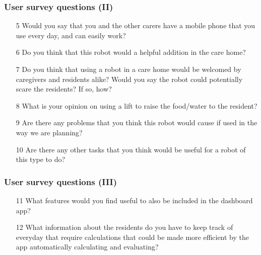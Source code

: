 \documentclass{beamer}
\begin{document}
\begin{frame}
  \frametitle{User survey questions (II)}
  \begin{enumerate}
    \item[5] Would you say that you and the other carers have a mobile phone that you use every day, and can easily work?
    \item[6] Do you think that this robot would a helpful addition in the care home?
    \item[7] Do you think that using a robot in a care home would be welcomed by caregivers and residents alike? Would you say the robot could potentially scare the residents? If so, how?
    \item[8] What is your opinion on using a lift to raise the food/water to the resident?
    \item[9] Are there any problems that you think this robot would cause if used in the way we are planning?
    \item[10] Are there any other tasks that you think would be useful for a robot of this type to do?
  \end{enumerate}
\end{frame}

\begin{frame}
  \frametitle{User survey questions (III)}
  \begin{enumerate}
    \item[11] What features would you find useful to also be included in the dashboard app?
    \item[12]  What information about the residents do you have to keep track of everyday that require calculations that could be made more efficient by the app automatically calculating and evaluating?
  \end{enumerate}
\end{frame}
\end{document}
